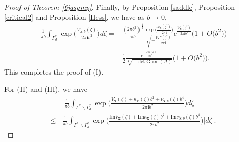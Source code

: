 \documentclass[11pt]{article}
\renewcommand{\setminus}{{\smallsetminus}}
\theoremstyle{remark}
\theoremstyle{remark}
\numberwithin{equation}{section}
\begin{document}
\begin{proof}[Proof of Theorem \ref{6jasymp}]
Finally, by Proposition \ref{saddle}, Proposition \ref{critical2}  and Proposition \ref{Hess}, we have as $b\to 0,$
\begin{equation*}
\begin{split}
\frac{1}{\pi b}\int_{\Gamma^*_d}\exp\bigg(\frac{V_{\boldsymbol  x,b}(\zeta)}{2\pi \mathbf ib^2}\bigg) d\zeta=& \frac{(2\pi b^2)^\frac{1}{2}}{\pi b} \frac{\exp\big(\frac{\kappa_{\boldsymbol  x}(\zeta^*)}{2\pi \mathbf i}\big)}{\sqrt{-\frac{V_{\boldsymbol  x}''(\zeta^*)}{2\pi \mathbf i}}}e^{\frac{V_{\boldsymbol x}(\zeta^*)}{2\pi \mathbf i b^2}}\Big(1+O\big(b^2\big)\Big)\\
=&\frac{1}{2}\frac{e^{\frac{-\mathrm{Cov}(\Delta)}{\pi b^2}}}{\sqrt[4]{-\det\mathrm{Gram}(\Delta)}}\Big(1+O\big(b^2\big)\Big).
\end{split}
\end{equation*}
This completes the proof of (I). 
\medskip

For (II) and (III), we have
\begin{equation*}
\begin{split}
& \bigg|\frac{1}{\pi b}\int_{\Gamma^*\setminus \Gamma^*_d}\exp\bigg(\frac{V_{\boldsymbol  x}(\zeta)+ \kappa_{\boldsymbol  x}(\zeta)b^2+ \nu_{\boldsymbol  x,b}(\zeta)b^4}{2\pi \mathbf i b^2} \bigg)d\zeta\bigg|\\
\leqslant & \frac{1}{\pi b}\int_{\Gamma^*\setminus \Gamma^*_d}\exp\bigg(\frac{\mathrm{Im}V_{\boldsymbol  x}(\zeta)+\mathrm{Im}\kappa_{\boldsymbol  x}(\zeta)b^2+\mathrm{Im}\nu_{\boldsymbol  x,b}(\zeta)b^4}{2\pi b^2} \bigg)|d\zeta|.
\end{split}
\end{equation*}
\smallskip



\end{proof}
\end{document}
